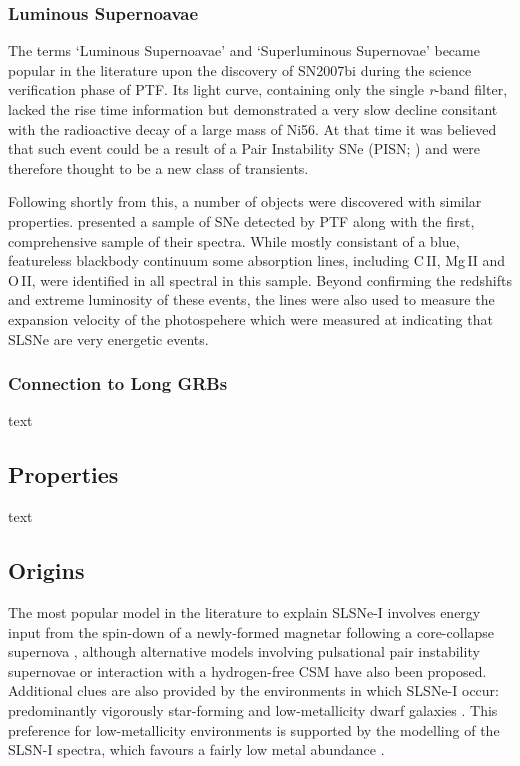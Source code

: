 \subsubsection{Luminous Supernoavae}
The terms `Luminous Supernoavae' and `Superluminous Supernovae' became popular in the literature upon the discovery of SN2007bi \citep{Gal-Yam2009} during the science verification phase of PTF. Its light curve, containing only the single \textit{r}-band filter, lacked the rise time information but demonstrated a very slow decline consitant with the radioactive decay of a large mass of Ni56. At that time it was believed that such event could be a result of a Pair Instability SNe (PISN; ) and were therefore thought to be a new class of transients.

Following shortly from this, a number of objects were discovered with similar properties. \citet{Quimby2009} presented a sample of SNe detected by PTF along with the first, comprehensive sample of their spectra. While mostly consistant of a blue, featureless blackbody continuum some absorption lines, including C\,II, Mg\,II and O\,II, were identified in all spectral in this sample. Beyond confirming the redshifts and extreme luminosity of these events, the lines were also used to measure the expansion velocity of the photospehere which were measured at indicating that SLSNe are very energetic events. 

\subsubsection{Connection to Long GRBs}
text

\subsection{Properties}
text

\subsection{Origins} \label{sec:Origins}
The most popular model in the literature to explain SLSNe-I involves
energy input from the spin-down of a newly-formed magnetar following a
core-collapse supernova
\citep{2010ApJ...717..245K,2010ApJ...719L.204W,2013ApJ...770..128I},
although alternative models involving pulsational pair instability
supernovae \citep{2007Natur.450..390W,2015ApJ...814..108Y} or
interaction with a hydrogen-free CSM
\citep{2011ApJ...729L...6C,2013ApJ...773...76C,2015arXiv151000834S}
have also been proposed. Additional clues are also provided by the
environments in which SLSNe-I occur: predominantly vigorously
star-forming and low-metallicity dwarf galaxies \citep[e.g.,][]{2014ApJ...787..138L,2015MNRAS.449..917L,2016arXiv160504925C}. This preference for low-metallicity
environments is supported by the modelling of the SLSN-I spectra,
which favours a fairly low metal abundance
\citep{2016MNRAS.458.3455M}.

